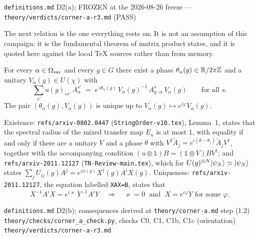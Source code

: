%
{\texttt{definitions.md} D2(a); FROZEN at the 2026-08-26 freeze}%
{---}%
{\texttt{theory/verdicts/corner-a-r3.md} (PASS)}

The next relation is the one everything rests on. It is not an assumption of
this campaign: it is the fundamental theorem of matrix product states, and it
is quoted here against the local \TeX{} sources rather than from memory.

\begin{definition}
\label{def:intertwining}
For every $\alpha \in \Omega_{\mathrm{vac}}$ and every $g \in G$ there exist a phase
$\theta_{\alpha}(g) \in \mathbb{R}/2\pi\mathbb{Z}$ and a unitary $V_{\alpha}(g) \in U(\chi)$
with
\begin{equation}
  \sum_{s'} u(g)_{s s'} \, A_{\alpha}^{s'}
  \;=\; e^{\,i \theta_{\alpha}(g)} \,
        V_{\alpha}(g)^{-1} \, A_{g \cdot \alpha}^{s} \, V_{\alpha}(g)
  \qquad \text{for all } s .
  \label{eq:IT}
\end{equation}
The pair $(\theta_{\alpha}(g), V_{\alpha}(g))$ is unique up to
$V_{\alpha}(g) \mapsto e^{i\varphi} V_{\alpha}(g)$.
\end{definition}

\begin{remark}
Existence: \texttt{refs/arxiv-0802.0447} (\texttt{StringOrder-v10.tex}),
Lemma~1, states that the spectral radius of the mixed transfer map $E_{u}$ is
at most $1$, with equality if and only if there are a unitary $V$ and a phase
$\theta$ with
$V^{\dagger} \tilde{A}_{j} = e^{i(\theta - \theta_{j})} \tilde{A}_{j}
 V^{\dagger}$, together with the accompanying condition
$(u \otimes \mathbb{1}) B = (\mathbb{1} \otimes V) B V^{\dagger}$; and
\texttt{refs/arxiv-2011.12127} (\texttt{TN-Review-main.tex}), which for
$U(g)^{\otimes N} |\psi_{N}\rangle \simeq |\psi_{N}\rangle$ states
$\sum_{j} U_{ij}(g) A^{j} = e^{i\phi(g)} X^{\dagger}(g) A^{i} X(g)$.
Uniqueness: \texttt{refs/arxiv-2011.12127}, the equation labelled
\texttt{XAX=B}, states that
\begin{equation}
  X^{-1} A^{i} X = e^{i\varkappa} \, Y^{-1} A^{i} Y
  \quad \Longrightarrow \quad
  \varkappa = 0 \; \text{ and } \; X = e^{i\varphi} Y
  \text{ for some } \varphi .
\end{equation}
\end{remark}

%
{\texttt{definitions.md} D2(b); consequences derived at
 \texttt{theory/corner-a.md} step (1.2)}%
{\texttt{theory/checks/corner\_a\_check.py}, checks C0, C1, C1b, C1c
 (orientation)}%
{\texttt{theory/verdicts/corner-a-r3.md}}


